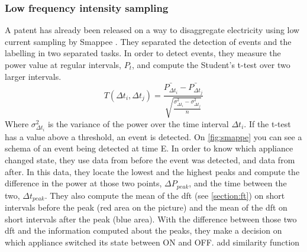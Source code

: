 \subsubsection{Low frequency intensity sampling}\label{section:low-freq}
A patent has already been released on a way to disaggregate electricity using low current sampling by Smappee \cite{bruneel2018energy}. They separated the detection of events and the labelling in two separated tasks. In order to detect events, they measure the power value at regular intervals, $P_t$, and compute the Student's t-test over two larger intervals.
\begin{equation} T(\Delta t_i, \Delta t_j) = \frac{\bar{P_{\Delta t_i}}-\bar{P_{\Delta t_j}}}{\sqrt{\frac{\sigma^2_{\Delta t_i} - \sigma^2_{\Delta t_j}}{n}}} \end{equation}
Where $\sigma^2_{\Delta t_i}$ is the variance of the power over the time interval $\Delta t_i$. If the t-test has a value above a threshold, an event is detected.
On \autoref{fig:smappe} you can see a schema of an event being detected at time E. In order to know which appliance changed state, they use data from before the event was detected, and data from after. In this data, they locate the lowest and the highest peaks and compute the difference in the power at those two points, $\Delta P_{peak}$, and the time between the two, $\Delta t_{peak}$. They also compute the mean of the \acrshort{dft} (see \autoref{section:ft}) on short intervals before the peak (red area on the picture) and the mean of the \acrshort{dft} on short intervals after the peak (blue area). With the difference between those two \acrshort{dft} and the information computed about the peaks, they make a decision on which appliance switched its state between ON and OFF.
{\color{red}add similarity function}

